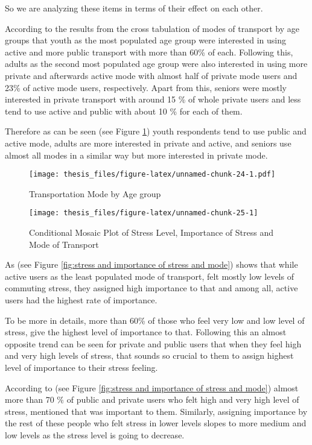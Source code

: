 \documentclass[
11pt, %
oneside, %
english, %
singlespacing, %
]{macthesis} %
\begin{document}
So we are analyzing these items in terms of their effect on each other.

According to the results from the cross tabulation of modes of transport by age groups that youth as the most populated age group were interested in using active and more public transport with more than 60\% of each. Following this, adults as the second most populated age group were also interested in using more private and afterwards active mode with almost half of private mode users and 23\% of active mode users, respectively. Apart from this, seniors were mostly interested in private transport with around 15 \% of whole private users and less tend to use active and public with about 10 \% for each of them.

Therefore as can be seen (see Figure \ref{fig:Transportation Mode by Age group}) youth respondents tend to use public and active mode, adults are more interested in private and active, and seniors use almost all modes in a similar way but more interested in private mode.
\begin{figure}
\centering
\texttt{[image: thesis\_files/figure-latex/unnamed-chunk-24-1.pdf]}
\caption{\label{fig:unnamed-chunk-24}\label{fig:Transportation Mode by Age group}Transportation Mode by Age group}
\end{figure}
\begin{figure}

{\centering \texttt{[image: thesis\_files/figure-latex/unnamed-chunk-25-1]} 

}

\caption{\label{fig:stress and importance of stress and mode}Conditional Mosaic Plot of Stress Level, Importance of Stress and Mode of Transport}\label{fig:unnamed-chunk-25}
\end{figure}
As (see Figure \ref{fig:stress and importance of stress and mode}) shows that while active users as the least populated mode of transport, felt mostly low levels of commuting stress, they assigned high importance to that and among all, active users had the highest rate of importance.

To be more in details, more than 60\% of those who feel very low and low level of stress, give the highest level of importance to that. Following this an almost opposite trend can be seen for private and public users that when they feel high and very high levels of stress, that sounds so crucial to them to assign highest level of importance to their stress feeling.

According to (see Figure \ref{fig:stress and importance of stress and mode}) almost more than 70 \% of public and private users who felt high and very high level of stress, mentioned that was important to them. Similarly, assigning importance by the rest of these people who felt stress in lower levels slopes to more medium and low levels as the stress level is going to decrease.
\end{document}
